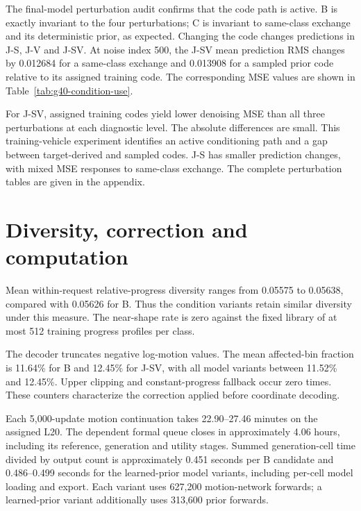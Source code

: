 The final-model perturbation audit confirms that the code path is active. B is exactly invariant to the four perturbations; C is invariant to same-class exchange and its deterministic prior, as expected. Changing the code changes predictions in J-S, J-V and J-SV. At noise index 500, the J-SV mean prediction RMS changes by 0.012684 for a same-class exchange and 0.013908 for a sampled prior code relative to its assigned training code. The corresponding MSE values are shown in Table~\ref{tab:g40-condition-use}.



For J-SV, assigned training codes yield lower denoising MSE than all three perturbations at each diagnostic level. The absolute differences are small. This training-vehicle experiment identifies an active conditioning path and a gap between target-derived and sampled codes. J-S has smaller prediction changes, with mixed MSE responses to same-class exchange. The complete perturbation tables are given in the appendix.

\FloatBarrier
\section{Diversity, correction and computation}
Mean within-request relative-progress diversity ranges from 0.05575 to 0.05638, compared with 0.05626 for B. Thus the condition variants retain similar diversity under this measure. The near-shape rate is zero against the fixed library of at most 512 training progress profiles per class.

The decoder truncates negative log-motion values. The mean affected-bin fraction is 11.64\% for B and 12.45\% for J-SV, with all model variants between 11.52\% and 12.45\%. Upper clipping and constant-progress fallback occur zero times. These counters characterize the correction applied before coordinate decoding.



Each 5,000-update motion continuation takes 22.90--27.46 minutes on the assigned L20. The dependent formal queue closes in approximately 4.06 hours, including its reference, generation and utility stages. Summed generation-cell time divided by output count is approximately 0.451 seconds per B candidate and 0.486--0.499 seconds for the learned-prior model variants, including per-cell model loading and export. Each variant uses 627,200 motion-network forwards; a learned-prior variant additionally uses 313,600 prior forwards.
